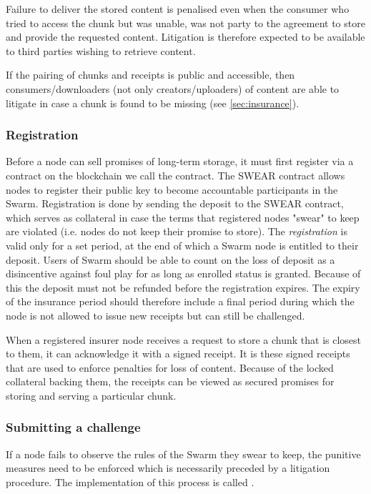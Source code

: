 Failure to deliver the stored content is penalised even when the consumer who tried to access the chunk but was unable, was not party to the agreement to store and provide the requested content. Litigation is therefore expected to be available to third parties wishing to retrieve content.

If the pairing of chunks and receipts is public and accessible, then consumers/downloaders (not only creators/uploaders) of content are able to litigate in case a chunk is found to be missing (see \ref{sec:insurance}). 

\subsubsection{Registration}

Before a node can sell promises of long-term storage, it must first register via a contract on the blockchain we call the  contract. The SWEAR contract allows nodes to register their public key to become accountable participants in the Swarm. Registration is done by sending the deposit to the SWEAR contract, which serves as collateral in case the terms that registered nodes "swear" to keep are violated (i.e. nodes do not keep their promise to store). The \emph{registration} is valid only for a set period, at the end of which a Swarm node is entitled to their deposit. Users of Swarm should be able to count on the loss of deposit as a disincentive against foul play for as long as enrolled status is granted. Because of this the deposit must not be refunded before the registration expires. The expiry of the insurance period should therefore include a final period during which the node is not allowed to issue new receipts but can still be challenged.

When a registered insurer node receives a request to store a chunk that is closest to them, it can acknowledge it with a signed receipt. It is these signed receipts that are used to enforce penalties for loss of content. Because of the locked collateral backing them, the receipts can be viewed as secured promises for storing and serving a particular chunk.



\subsubsection{Submitting a challenge}


If a node fails to observe the rules of the Swarm they swear to keep, the punitive measures need to be enforced which is necessarily preceded by a litigation procedure. The implementation of this process is called .

